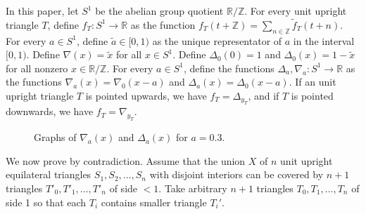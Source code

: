 \documentclass[a4paper]{amsart}
\theoremstyle{plain}
\theoremstyle{definition}
\begin{document}
In this paper, let \(S^1\) be the abelian group quotient \(\mathbb{R} /\mathbb{Z}\). For every unit upright triangle \(T\), define \(f_T : S^1 \to \mathbb{R}\) as the function \(f_T(t + \mathbb{Z}) = \sum_{n \in \mathbb{Z}} \tilde{f}_T(t + n)\).
For every \(a \in S^1\), define \(\tilde{a} \in [0, 1)\) as the unique representator of \(a\) in the interval \([0, 1)\). Define \(\nabla (x) = \tilde{x}\) for all \(x \in S^1\). Define \(\Delta_0 (0) = 1\) and \(\Delta_0(x) = 1 - \tilde{x}\) for all nonzero \(x \in \mathbb{R}/\mathbb{Z}\). For every \(a \in S^1\), define the functions \(\Delta_a , \nabla_a : S^1 \to \mathbb{R}\) as the functions \(\nabla_a(x) = \nabla_0(x-a)\) and \(\Delta_a(x) = \Delta_0(x-a)\). If an unit upright triangle \(T\) is pointed upwards, we have \(f_T = \Delta_{y_T}\), and if \(T\) is pointed downwards, we have \(f_T = \nabla_{y_T}\). 


\begin{figure}
  \centering
  \qquad
  \label{fig:graph}
  \caption{Graphs of $\nabla_a(x)$ and $\Delta_a(x)$ for $a = 0.3$.}
\end{figure}





We now prove  by contradiction. Assume that the union \(X\) of \(n\) unit upright equilateral triangles \(S_1, S_2, \dots, S_n\) with disjoint interiors can be covered by \(n+1\) triangles \(T'_0, T'_1, \dots, T'_n\) of side \(< 1\). Take arbitrary \(n + 1\) triangles \(T_0, T_1, \dots, T_n\) of side 1 so that each \(T_i\) contains smaller triangle \(T_i'\).
\end{document}
